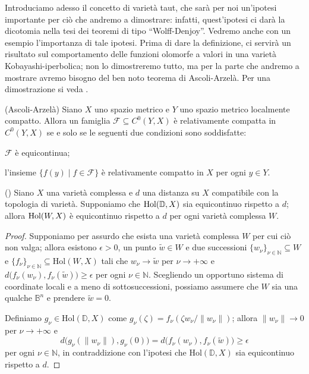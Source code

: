 Introduciamo adesso il concetto di varietà taut, che sarà per noi un'ipotesi importante per ciò che andremo a dimostrare: infatti, quest'ipotesi ci darà la dicotomia nella tesi dei teoremi di tipo ``Wolff-Denjoy''. Vedremo anche con un esempio l'importanza di tale ipotesi. Prima di dare la definizione, ci servirà un risultato sul comportamento delle funzioni olomorfe a valori in una varietà Kobayashi-iperbolica; non lo dimostreremo tutto, ma per la parte che andremo a mostrare avremo bisogno del ben noto teorema di Ascoli-Arzelà. Per una dimostrazione si veda \cite[Chapter 7, Theorem 17]{Ke}.

\begin{thm}
    (Ascoli-Arzelà) Siano $X$ uno spazio metrico e $Y$ uno spazio metrico localmente compatto. Allora un famiglia $\mathcal{F}\subseteq C^0(Y,X)$ è relativamente compatta in $C^0(Y,X)$ se e solo se le seguenti due condizioni sono soddisfatte:
    \begin{nlist}
        \item $\mathcal{F}$ è equicontinua;
        \item l'insieme $\{f(y)\mid f\in\mathcal{F}\}$ è relativamente compatto in $X$ per ogni $y\in Y$.
    \end{nlist}
\end{thm}

\begin{lm} \label{equico}
    (\cite[Theorem 1]{B1}) Siano $X$ una varietà complessa e $d$ una distanza su $X$ compatibile con la topologia di varietà. Supponiamo che $\textnormal{Hol}(\mathbb{D},X)$ sia equicontinuo rispetto a $d$; allora $\textnormal{Hol}(W,X)$ è equicontinuo rispetto a $d$ per ogni varietà complessa $W$.
\end{lm}

\begin{proof}
    Supponiamo per assurdo che esista una varietà complessa $W$ per cui ciò non valga; allora esistono $\epsilon>0$, un punto $\tilde{w}\in W$ e due successioni $\{w_\nu\}_{\nu\in\mathbb{N}}\subseteq W$ e $\{f_\nu\}_{\nu\in\mathbb{N}}\subseteq \text{Hol}(W,X)$ tali che $w_\nu\longrightarrow \tilde{w}$ per $\nu\longrightarrow+\infty$ e $d\big(f_\nu(w_\nu),f_\nu(\tilde{w})\big)\ge\epsilon$ per ogni $\nu\in\mathbb{N}$. Scegliendo un opportuno sistema di coordinate locali e a meno di sottosuccessioni, possiamo assumere che $W$ sia una qualche $\mathbb{B}^n$ e prendere $\tilde{w}=0$.

    Definiamo $g_\nu\in\text{Hol}(\mathbb{D},X)$ come $g_\nu(\zeta)=f_\nu(\zeta w_\nu/\|w_\nu\|)$; allora $\|w_\nu\|\longrightarrow 0$ per $\nu\longrightarrow+\infty$ e
    $$d\big(g_\nu(\|w_\nu\|),g_\nu(0)\big)=d\big(f_\nu(w_\nu),f_\nu(\tilde{w})\big)\ge\epsilon$$
    per ogni $\nu\in\mathbb{N}$, in contraddizione con l'ipotesi che $\text{Hol}(\mathbb{D},X)$ sia equicontinuo rispetto a $d$.
\end{proof}

